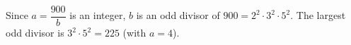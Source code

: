 Since $a=\dfrac{900}{b}$ is an integer, $b$ is an odd divisor of $900=2^2\cdot3^2\cdot5^2$. The largest odd divisor is $3^2\cdot5^2=\boxed{225}$ (with $a=4$).
